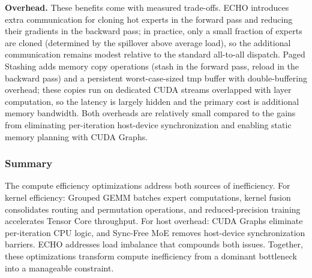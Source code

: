 \noindent\textbf{Overhead.}
These benefits come with measured trade-offs.
ECHO introduces extra communication for cloning hot experts in the forward pass and reducing their gradients in the backward pass; in practice, only a small fraction of experts are cloned (determined by the spillover above average load), so the additional communication remains modest relative to the standard all-to-all dispatch.
Paged Stashing adds memory copy operations (stash in the forward pass, reload in the backward pass) and a persistent worst-case-sized tmp buffer with double-buffering overhead; these copies run on dedicated CUDA streams overlapped with layer computation, so the latency is largely hidden and the primary cost is additional memory bandwidth.
Both overheads are relatively small compared to the gains from eliminating per-iteration host-device synchronization and enabling static memory planning with CUDA Graphs.

\subsubsection{Summary}

The compute efficiency optimizations address both sources of inefficiency. For kernel efficiency: Grouped GEMM batches expert computations, kernel fusion consolidates routing and permutation operations, and reduced-precision training accelerates Tensor Core throughput. For host overhead: CUDA Graphs eliminate per-iteration CPU logic, and Sync-Free MoE removes host-device synchronization barriers. ECHO addresses load imbalance that compounds both issues. Together, these optimizations transform compute inefficiency from a dominant bottleneck into a manageable constraint.

